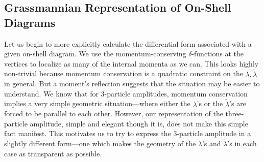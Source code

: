 \documentclass[12pt,hyperref,compress]{JHEP3}
\begin{document}
\subsection{Grassmannian Representation of On-Shell Diagrams}
Let us begin to more explicitly calculate the differential form associated with a given on-shell diagram. We use the momentum-conserving $\delta$-functions at the vertices to localize as many of the internal momenta as we can. This looks highly non-trivial because momentum conservation is a quadratic constraint on the $\lambda, \widetilde \lambda$ in general. But a moment's reflection suggests that the situation may be easier to understand. We know that for $3$-particle amplitudes, momentum conservation implies a very simple geometric situation---where either the $\lambda$'s or the $\widetilde \lambda$'s are forced to be parallel to each other. However, our representation of the three-particle amplitude, simple and elegant though it is, does not make this simple fact manifest. This motivates us to try to express the 3-particle amplitude in a slightly different form---one which makes the geometry of the $\lambda$'s and $\widetilde\lambda$'s in each case as transparent as possible.
\end{document}
